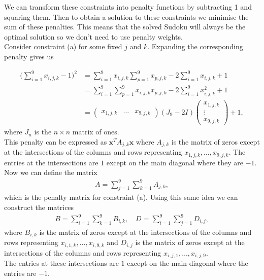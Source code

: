 \documentclass{article}
\begin{document}
\noindent We can transform these constraints into penalty functions by subtracting 1 and squaring them. Then to obtain a solution to these constraints we minimise the sum of these penalties. This means that the solved Sudoku will always be the optimal solution so we don't need to use penalty weights.\\

\noindent Consider constraint (a) for some fixed \(j\) and \(k\). Expanding the corresponding penalty gives us

\begin{align*}
    \bigg(\sum_{i=1}^9 x_{i,j,k} - 1\bigg)^2 &= \sum_{i=1}^9 x_{i,j,k}\sum_{p=1}^9 x_{p,j,k} -2\sum_{i=1}^9 x_{i,j,k} + 1  \\
    &= \sum_{i=1}^9\sum_{p=1}^9 x_{i,j,k}x_{p,j,k} -2\sum_{i=1}^9 x_{i,j,k}^2 + 1 \\
    &= \begin{pmatrix}
        x_{1,j,k} & \dots & x_{9,j,k}
    \end{pmatrix} (J_{9} - 2I) \begin{pmatrix}
        x_{1,j,k} \\
        \vdots \\
        x_{9,j,k}
    \end{pmatrix} + 1,
\end{align*}
where \(J_{n}\) is the \(n \times n\) matrix of ones. \\

\noindent This penalty can be expressed as \(\mathbf{x}^T A_{j,k} \mathbf{x}\) where \(A_{j,k}\) is the matrix of zeros except at the intersections of the columns and rows representing \(x_{1,j,k}, \dots, x_{9,j,k}\). The entries at the intersections are \(1\) except on the main diagonal where they are \(-1\).\\

\noindent Now we can define the matrix 
\begin{align*}
    A = \sum_{j=1}^9\sum_{k=1}^9 A_{j,k},
\end{align*}
which is the penalty matrix for constraint (a). Using this same idea we can construct the matrices 
\begin{align*}
    B = \sum_{i=1}^9\sum_{k=1}^9 B_{i,k}, \quad D = \sum_{i=1}^9\sum_{j=1}^9 D_{i,j},
\end{align*}
where \(B_{i,k}\) is the matrix of zeros except at the intersections of the columns and rows representing \(x_{i,1,k}, \dots, x_{i,9,k}\) and \(D_{i,j}\) is the matrix of zeros except at the intersections of the columns and rows representing \(x_{i,j,1}, \dots, x_{i,j,9}\).\\
The entries at these intersections are \(1\) except on the main diagonal where the entries are \(-1\).\\
\end{document}
